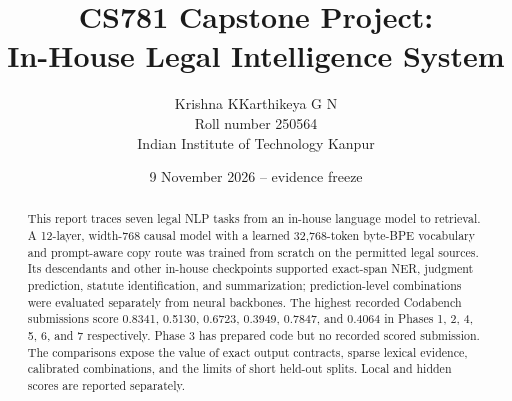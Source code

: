 \documentclass[11pt,oneside]{article}
\title{CS781 Capstone Project:\\In-House Legal Intelligence System}
\author{Krishna KKarthikeya G N\\Roll number 250564\\Indian Institute of Technology Kanpur}
\date{9 November 2026 -- evidence freeze}
\begin{document}
\maketitle
\begin{abstract}
This report traces seven legal NLP tasks from an in-house language model to retrieval. A 12-layer, width-768 causal model with a learned 32,768-token byte-BPE vocabulary and prompt-aware copy route was trained from scratch on the permitted legal sources. Its descendants and other in-house checkpoints supported exact-span NER, judgment prediction, statute identification, and summarization; prediction-level combinations were evaluated separately from neural backbones. The highest recorded Codabench submissions score 0.8341, 0.5130, 0.6723, 0.3949, 0.7847, and 0.4064 in Phases 1, 2, 4, 5, 6, and 7 respectively. Phase 3 has prepared code but no recorded scored submission. The comparisons expose the value of exact output contracts, sparse lexical evidence, calibrated combinations, and the limits of short held-out splits. Local and hidden scores are reported separately.
\end{abstract}
\end{document}

